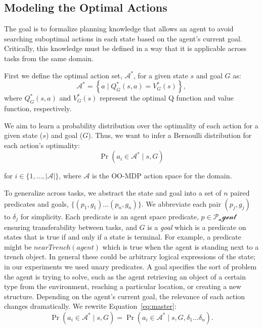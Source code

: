 \documentclass[11pt]{article}
\begin{document}
\subsection{Modeling the Optimal Actions}

The goal is to formalize planning knowledge that allows an agent to
avoid searching suboptimal actions in each state based on the agent's
current goal. Critically, this knowledge must be defined in a way that it is applicable across tasks from the same domain.

First we define the optimal action set, $\mathcal{A}^*$, for a
given state $s$ and goal $G$ as:
\begin{equation}
\mathcal{A}^* = \left\{ a \mid Q^*_G(s,a) = V^*_G(s) \right\}, 
\label{eq:opt_act_set}
\end{equation}
where $Q^*_G(s,a)$ and $V^*_G(s)$ represent the optimal Q function and 
value function, respectively.

We aim to learn a probability distribution over the optimality of each action
for a given state ($s$) and goal ($G$). Thus, we want to infer a Bernoulli
distribution for each action's optimality:
\begin{equation}
\Pr(a_i \in \mathcal{A}^* \mid s, G)
\label{eq:master}
\end{equation}

\noindent for $i \in \{1, \ldots, |\mathcal{A}|\}$, where
$\mathcal{A}$ is the OO-MDP action space for the domain.

To generalize across tasks, we abstract the state
and goal into a set of $n$ paired predicates and goals, $\{
(p_1, g_1) \ldots (p_{n}, g_{n}) \}$. We abbreviate each pair $(p_j,
g_j)$ to $\delta_j$ for simplicity. Each predicate is an agent space predicate, $p \in
\mathcal{P_agent}$ ensuring transferability between tasks, and $G$ is a {\it goal} which is a
predicate on states that is true if and only if a state is terminal. For example, a
predicate might be $nearTrench(agent)$ which is true when the agent is
standing next to a trench object.  In general these could be arbitrary
logical expressions of the state; in our experiments we used unary
predicates. A goal specifies the sort of problem the agent is trying to solve, such as the agent
retrieving an object of a certain type from the environment, reaching
a particular location, or creating a new structure.  Depending on the
agent's current goal, the relevance of each action changes
dramatically.  We rewrite Equation~\ref{eq:master}:
\begin{equation}
\Pr(a_i \in \mathcal{A}^* \mid s, G) = \Pr(a_i \in \mathcal{A}^* \mid s, G, \delta_1 \ldots \delta_n).
\end{equation}
\end{document}
